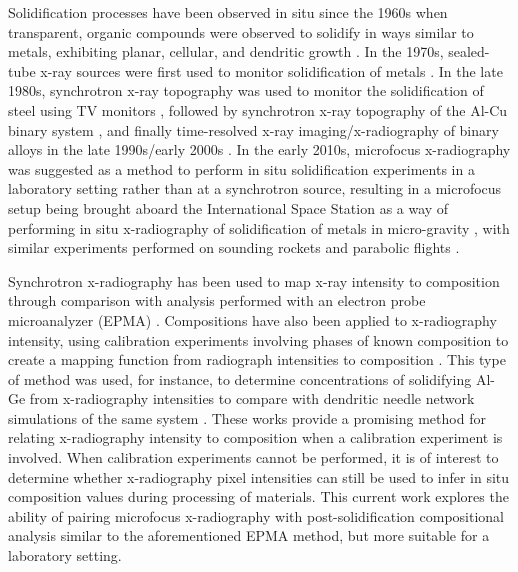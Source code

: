 Solidification processes have been observed in situ since the 1960s when
transparent, organic compounds were observed to solidify in ways similar
to metals, exhibiting planar, cellular, and dendritic growth \cite{Jackson1965}.
In the
1970s, sealed-tube x-ray sources were first used to monitor solidification
of metals \cite{Stephenson1977}.
In the late 1980s, synchrotron x-ray topography was used to
monitor the solidification of steel using TV monitors \cite{Yamada1987},
followed by
synchrotron x-ray topography of the Al-Cu binary system \cite{Grange1994},
and finally
time-resolved x-ray imaging/x-radiography of binary alloys in the late
1990s/early 2000s \cite{Mathiesen1999a,Mathiesen2002}.
In the early 2010s, microfocus x-radiography was
suggested as a method to perform in situ solidification experiments in a
laboratory setting rather than at a synchrotron source, resulting in a
microfocus setup being brought aboard the International Space Station as a
way of performing in situ x-radiography of solidification of metals in
micro-gravity \cite{Rakete2011b},
with similar experiments performed on sounding rockets \cite{Nguyen2013}
and parabolic flights \cite{Murphy2014}.

Synchrotron x-radiography has been used to map x-ray intensity to
composition through comparison with analysis performed with an electron
probe microanalyzer (EPMA) \cite{Husseini2008}.
Compositions have also been applied to
x-radiography intensity, using calibration experiments involving phases of
known composition to create a mapping function from radiograph intensities
to composition
\cite{Husseini2008,Griesche2010,Han2017,Ruvalcaba2007,Bogno2011,Bogno2013,Becker2016a}.
This type of method was used, for
instance, to determine concentrations of solidifying Al-Ge from
x-radiography intensities to compare with dendritic needle network
simulations of the same system \cite{Becker2020,Tourret2016}.
These works provide a promising
method for relating x-radiography intensity to composition when a
calibration experiment is involved. When calibration experiments cannot be
performed, it is of interest to determine whether x-radiography pixel
intensities can still be used to infer in situ composition values during
processing of materials. This current work explores the ability of pairing
microfocus x-radiography with post-solidification compositional analysis
similar to the aforementioned EPMA method, but more suitable for a
laboratory setting.

